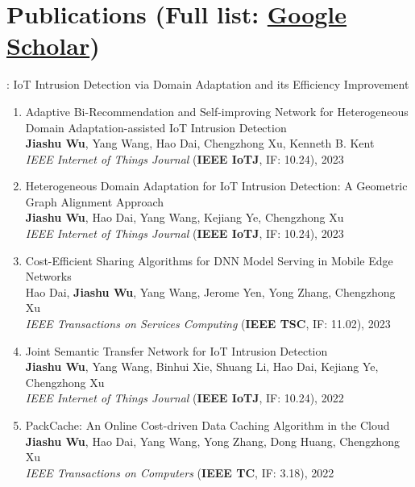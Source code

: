 \documentclass[letterpaper,11pt]{article}
\newcommand{\RNum}[1]{\uppercase\expandafter{\romannumeral #1\relax}}
\begin{document}
\vspace{1pt}

\section{Publications (Full list: \href{https://scholar.google.com/citations?user=wGgUbQkAAAAJ}{Google Scholar})}

\RNum{1}: IoT Intrusion Detection via Domain Adaptation and its Efficiency Improvement
\begin{enumerate}
  \item Adaptive Bi-Recommendation and Self-improving Network for Heterogeneous Domain Adaptation-assisted IoT Intrusion Detection\\
  \textbf{Jiashu Wu}, Yang Wang\textsuperscript{\Letter}, Hao Dai, Chengzhong Xu, Kenneth B. Kent\\
  \textit{IEEE Internet of Things Journal} (\textbf{IEEE IoTJ}, IF: 10.24), 2023

  \item Heterogeneous Domain Adaptation for IoT Intrusion Detection: A Geometric Graph Alignment Approach\\
  \textbf{Jiashu Wu}, Hao Dai, Yang Wang\textsuperscript{\Letter}, Kejiang Ye, Chengzhong Xu\\
  \textit{IEEE Internet of Things Journal} (\textbf{IEEE IoTJ}, IF: 10.24), 2023

  \item Cost-Efficient Sharing Algorithms for DNN Model Serving in Mobile Edge Networks\\
  Hao Dai, \textbf{Jiashu Wu}, Yang Wang\textsuperscript{\Letter}, Jerome Yen, Yong Zhang, Chengzhong Xu\\
  \textit{IEEE Transactions on Services Computing} (\textbf{IEEE TSC}, IF: 11.02), 2023

  \item Joint Semantic Transfer Network for IoT Intrusion Detection\\
  \textbf{Jiashu Wu}, Yang Wang\textsuperscript{\Letter}, Binhui Xie, Shuang Li, Hao Dai, Kejiang Ye, Chengzhong Xu\\
  \textit{IEEE Internet of Things Journal} (\textbf{IEEE IoTJ}, IF: 10.24), 2022

  \item PackCache: An Online Cost-driven Data Caching Algorithm in the Cloud\\
  \textbf{Jiashu Wu}, Hao Dai, Yang Wang\textsuperscript{\Letter}, Yong Zhang, Dong Huang, Chengzhong Xu\\
  \textit{IEEE Transactions on Computers} (\textbf{IEEE TC}, IF: 3.18), 2022


\end{enumerate}
\end{document}
